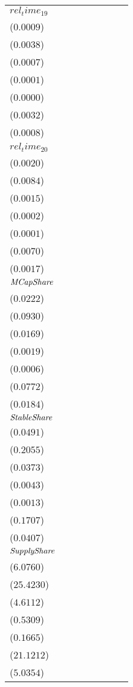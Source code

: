 \begin{tabular}{llllllll}
$rel_time_19$ & \makecell{$0.0051^{***}$ \\ ($0.0009$)} & \makecell{$0.0224^{***}$ \\ ($0.0038$)} & \makecell{$-0.0011^{}$ \\ ($0.0007$)} & \makecell{$-0.0000^{}$ \\ ($0.0001$)} & \makecell{$-0.0000^{}$ \\ ($0.0000$)} & \makecell{$0.0179^{***}$ \\ ($0.0032$)} & \makecell{$0.0040^{***}$ \\ ($0.0008$)} \\
$rel_time_20$ & \makecell{$0.0044^{**}$ \\ ($0.0020$)} & \makecell{$0.0169^{**}$ \\ ($0.0084$)} & \makecell{$-0.0006^{}$ \\ ($0.0015$)} & \makecell{$0.0000^{}$ \\ ($0.0002$)} & \makecell{$0.0000^{}$ \\ ($0.0001$)} & \makecell{$0.0149^{**}$ \\ ($0.0070$)} & \makecell{$0.0034^{**}$ \\ ($0.0017$)} \\
${\it MCapShare}$ & \makecell{$0.1488^{***}$ \\ ($0.0222$)} & \makecell{$0.6387^{***}$ \\ ($0.0930$)} & \makecell{$0.0302^{*}$ \\ ($0.0169$)} & \makecell{$0.0022^{}$ \\ ($0.0019$)} & \makecell{$0.0012^{*}$ \\ ($0.0006$)} & \makecell{$0.5965^{***}$ \\ ($0.0772$)} & \makecell{$0.1217^{***}$ \\ ($0.0184$)} \\
${\it StableShare}$ & \makecell{$-0.6346^{***}$ \\ ($0.0491$)} & \makecell{$-2.7477^{***}$ \\ ($0.2055$)} & \makecell{$-0.3475^{***}$ \\ ($0.0373$)} & \makecell{$-0.0435^{***}$ \\ ($0.0043$)} & \makecell{$-0.0129^{***}$ \\ ($0.0013$)} & \makecell{$-2.3896^{***}$ \\ ($0.1707$)} & \makecell{$-0.5031^{***}$ \\ ($0.0407$)} \\
${\it SupplyShare}$ & \makecell{$-30.1563^{***}$ \\ ($6.0760$)} & \makecell{$-123.4935^{***}$ \\ ($25.4230$)} & \makecell{$6.2614^{}$ \\ ($4.6112$)} & \makecell{$0.7374^{}$ \\ ($0.5309$)} & \makecell{$0.1173^{}$ \\ ($0.1665$)} & \makecell{$-99.7181^{***}$ \\ ($21.1212$)} & \makecell{$-24.2630^{***}$ \\ ($5.0354$)} \\

\end{tabular}

